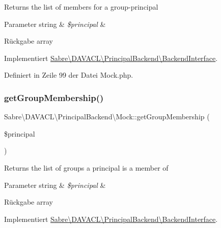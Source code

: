 Returns the list of members for a group-\/principal


\begin{DoxyParams}[1]{Parameter}
string & {\em \$principal} & \\
\hline
\end{DoxyParams}
\begin{DoxyReturn}{Rückgabe}
array 
\end{DoxyReturn}


Implementiert \mbox{\hyperlink{interface_sabre_1_1_d_a_v_a_c_l_1_1_principal_backend_1_1_backend_interface_adb97d3bf0d019cf48391a0bc1425e0ce}{Sabre\textbackslash{}\+D\+A\+V\+A\+C\+L\textbackslash{}\+Principal\+Backend\textbackslash{}\+Backend\+Interface}}.



Definiert in Zeile 99 der Datei Mock.\+php.

\mbox{\label{class_sabre_1_1_d_a_v_a_c_l_1_1_principal_backend_1_1_mock_a1de134b0b7f9c1e2e04bffb7c355a60f}} 
\subsubsection{\texorpdfstring{get\+Group\+Membership()}{getGroupMembership()}}
{\footnotesize\ttfamily Sabre\textbackslash{}\+D\+A\+V\+A\+C\+L\textbackslash{}\+Principal\+Backend\textbackslash{}\+Mock\+::get\+Group\+Membership (\begin{DoxyParamCaption}\item[{}]{\$principal }\end{DoxyParamCaption})}

Returns the list of groups a principal is a member of


\begin{DoxyParams}[1]{Parameter}
string & {\em \$principal} & \\
\hline
\end{DoxyParams}
\begin{DoxyReturn}{Rückgabe}
array 
\end{DoxyReturn}


Implementiert \mbox{\hyperlink{interface_sabre_1_1_d_a_v_a_c_l_1_1_principal_backend_1_1_backend_interface_ac57affc7cfeb292c4262bd555953c372}{Sabre\textbackslash{}\+D\+A\+V\+A\+C\+L\textbackslash{}\+Principal\+Backend\textbackslash{}\+Backend\+Interface}}.



